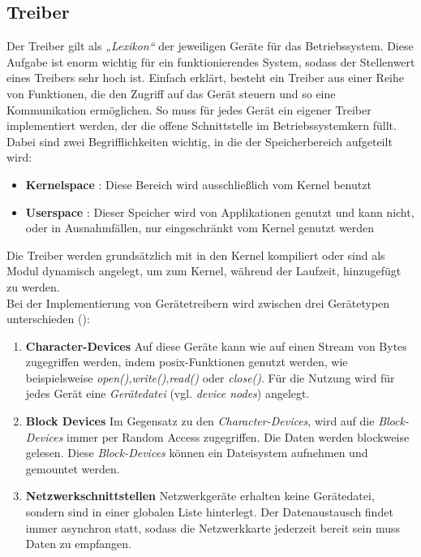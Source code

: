 \subsection{Treiber}\label{kap:treiber}

Der Treiber gilt als \emph{„Lexikon“} der jeweiligen Geräte für das Betriebssystem.
Diese Aufgabe ist enorm wichtig für ein funktionierendes System, sodass der Stellenwert
eines Treibers sehr hoch ist. Einfach erklärt, besteht ein Treiber aus einer Reihe von
Funktionen, die den Zugriff auf das Gerät steuern und so eine Kommunikation ermöglichen.
So muss für jedes Gerät ein eigener Treiber implementiert werden, der die offene
Schnittstelle im Betriebssystemkern füllt. \\
Dabei sind zwei Begrifflichkeiten wichtig, in die der Speicherbereich aufgeteilt wird:
\begin{itemize}
\item \textbf{Kernelspace} : Diese Bereich wird ausschließlich vom Kernel benutzt
\item \textbf{Userspace} : Dieser Speicher wird von Applikationen genutzt und kann nicht,
                          oder in Ausnahmfällen, nur eingeschränkt vom Kernel genutzt werden
\end{itemize}

Die Treiber werden grundsätzlich mit in den Kernel kompiliert oder sind als Modul dynamisch
angelegt, um zum Kernel, während der Laufzeit, hinzugefügt zu werden. \cite{treiberbib}\\

Bei der Implementierung von Gerätetreibern wird zwischen drei Gerätetypen unterschieden (\cite{treiberbib}):\\
\begin{enumerate}
\item \textbf{Character-Devices} Auf diese Geräte kann wie auf einen Stream von Bytes zugegriffen werden, indem
      \ac{posix}-Funktionen genutzt werden, wie beispielsweise \emph{open()},\emph{write()},\emph{read()} oder \emph{close()}.
      Für die Nutzung wird für jedes Gerät eine \emph{Gerätedatei} (vgl. \emph{device nodes}) angelegt.
\item \textbf{Block Devices} Im Gegensatz zu den \emph{Character-Devices}, wird auf die \emph{Block-Devices} immer per Random Access zugegriffen.
      Die Daten werden blockweise gelesen. Diese \emph{Block-Devices} können ein Dateisystem aufnehmen und gemountet werden.
\item \textbf{Netzwerkschnittstellen} Netzwerkgeräte erhalten keine Gerätedatei, sondern sind in einer globalen Liste hinterlegt.
      Der Datenaustausch findet immer asynchron statt, sodass die Netzwerkkarte jederzeit bereit sein muss Daten zu empfangen.
\end{enumerate}


